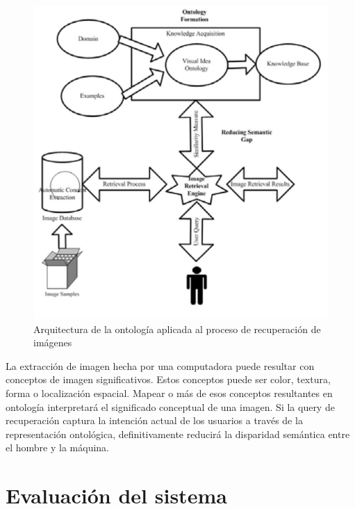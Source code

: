 \documentclass{llncs}
\begin{document}
\begin{figure}
    \caption{Arquitectura de la ontolog\'ia aplicada al proceso de recuperaci\'on de im\'agenes}
    \includegraphics[scale = .4]{./images/ontolgy-bases-image-retrieval-process.png}
\end{figure}

La extracci\'on de imagen hecha por una computadora puede resultar con conceptos de imagen 
significativos. Estos conceptos puede ser color, textura, forma o localizaci\'on espacial.
Mapear o m\'as de esos conceptos resultantes en ontolog\'ia interpretar\'a el significado 
conceptual de una imagen. Si la query de recuperaci\'on captura la intenci\'on actual de los
usuarios a trav\'es de la representaci\'on ontol\'ogica, definitivamente reducir\'a la disparidad 
sem\'antica entre el hombre y la m\'aquina.   

\noindent











\chapter*{Evaluación del sistema}
\end{document}
